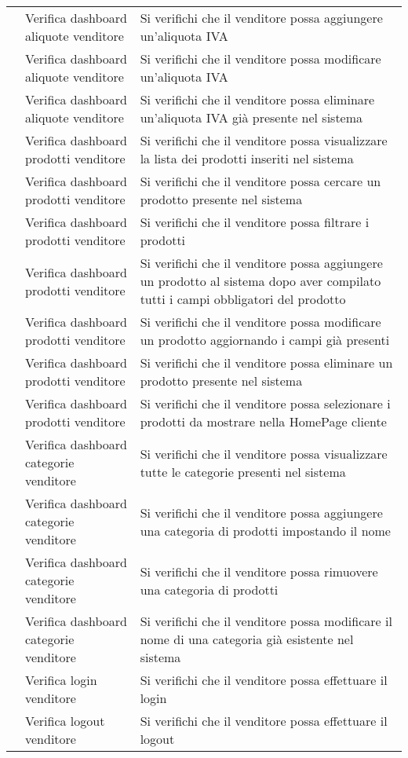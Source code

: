 \begin{center}
\begin{longtable}{p{1cm}|p{6.85cm}|p{7cm}|}
	 & Verifica dashboard aliquote venditore & Si verifichi che il venditore possa aggiungere un'aliquota IVA \\
	 & Verifica dashboard aliquote venditore & Si verifichi che il venditore possa modificare un'aliquota IVA \\
	 & Verifica dashboard aliquote venditore & Si verifichi che il venditore possa eliminare un'aliquota IVA già presente nel sistema \\
	 & Verifica dashboard prodotti venditore & Si verifichi che il venditore possa visualizzare la lista dei prodotti inseriti nel sistema \\
	 & Verifica dashboard prodotti venditore & Si verifichi che il venditore possa cercare un prodotto presente nel sistema \\
	 & Verifica dashboard prodotti venditore & Si verifichi che il venditore possa filtrare i prodotti \\
	 & Verifica dashboard prodotti venditore & Si verifichi che il venditore possa aggiungere un prodotto al sistema dopo aver compilato tutti i campi obbligatori del prodotto \\
	 & Verifica dashboard prodotti venditore & Si verifichi che il venditore possa modificare un prodotto aggiornando i campi già presenti\\
	 & Verifica dashboard prodotti venditore & Si verifichi che il venditore possa eliminare un prodotto presente nel sistema\\
	 & Verifica dashboard prodotti venditore & Si verifichi che il venditore possa selezionare i prodotti da mostrare nella HomePage cliente \\
	 & Verifica dashboard categorie venditore & Si verifichi che il venditore possa visualizzare tutte le categorie presenti nel sistema \\
	 & Verifica dashboard categorie venditore & Si verifichi che il venditore possa aggiungere una categoria di prodotti impostando il nome \\
	 & Verifica dashboard categorie venditore & Si verifichi che il venditore possa rimuovere una categoria di prodotti \\
	 & Verifica dashboard categorie venditore & Si verifichi che il venditore possa modificare il nome di una categoria già esistente nel sistema \\
	 & Verifica login venditore & Si verifichi che il venditore possa effettuare il login \\
	 & Verifica logout venditore & Si verifichi che il venditore possa effettuare il logout \\
	\hline

	\end{longtable}
\end{center}


